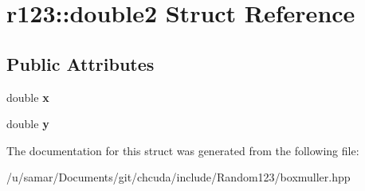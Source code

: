 \hypertarget{structr123_1_1double2}{}\section{r123\+:\+:double2 Struct Reference}
\label{structr123_1_1double2}
\subsection*{Public Attributes}
\begin{DoxyCompactItemize}
\item 
\hypertarget{structr123_1_1double2_a56bb85ee6730a9a30109b5db051fbd1b}{}\label{structr123_1_1double2_a56bb85ee6730a9a30109b5db051fbd1b} 
double {\bfseries x}
\item 
\hypertarget{structr123_1_1double2_a355ed766f070d275d7ad9268e15fb437}{}\label{structr123_1_1double2_a355ed766f070d275d7ad9268e15fb437} 
double {\bfseries y}
\end{DoxyCompactItemize}


The documentation for this struct was generated from the following file\+:\begin{DoxyCompactItemize}
\item 
/u/samar/\+Documents/git/chcuda/include/\+Random123/boxmuller.\+hpp\end{DoxyCompactItemize}
